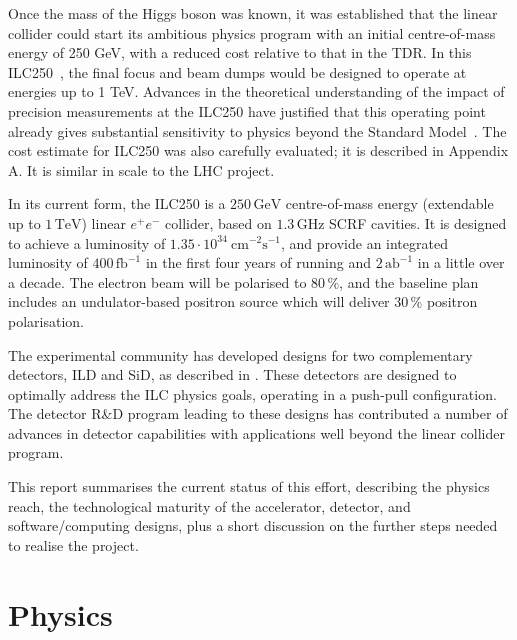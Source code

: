 \documentclass[%
 reprint,
 amsmath,amssymb,
 aps,
]{revtex4-1}
\begin{document}
Once the mass of the Higgs boson was known, it was established that the
linear collider could start its ambitious physics program with an initial centre-of-mass energy of 250 GeV, with a reduced cost relative to that in the TDR.  In this ILC250~\cite{Evans:2017rvt}, the final focus and beam dumps would be designed to operate at energies up to 1 TeV.
Advances in the theoretical understanding of the impact of precision
measurements at the 
 ILC250 have justified that this operating point already gives
 substantial 
sensitivity to physics beyond the Standard 
Model~\cite{Barklow:2017suo,Fujii:2017vwa}. 
 The cost estimate for ILC250 was also carefully evaluated;
it is described in Appendix A. It is similar in scale to the
LHC 
project.


In its current
form, the ILC250 is a $250\,{\mathrm{GeV}}$ centre-of-mass energy
(extendable up to $1\,{\mathrm{TeV}}$) linear $e^+e^-$ collider, based
on $1.3\,{\mathrm{GHz}}$  SCRF
cavities. It is designed to achieve a luminosity of $1.35\cdot
10^{34}~{\mathrm{cm}}^{-2}{\mathrm{s}}^{-1}$, and provide an integrated
luminosity of $400\,{\mathrm{fb}}^{-1}$ in the first four years of
running and $2\,{\mathrm{ab}}^{-1}$ in a little over a decade. The electron beam will be polarised to $80\,\%$, and the baseline plan includes an 
undulator-based
positron source which will  deliver
$30\,\%$ positron  polarisation. 


The experimental community has developed
designs for two complementary detectors, ILD and SiD, 
as described in \cite{Behnke:2013lya}. These detectors are designed to 
optimally address the
ILC physics goals, operating in a push-pull configuration.  
The detector R\&D program leading to these designs
has 
contributed a number of advances in 
detector capabilities with applications well beyond the linear
collider program. 

This report summarises the current status of this effort, describing
the physics reach, the technological maturity of the accelerator,
detector, and software/computing designs,
plus a short discussion on the further steps 
 needed to realise the project.

\vspace{-.4cm}

\section{\label{sec:phys}Physics}

\vspace{-.3cm}
\end{document}
